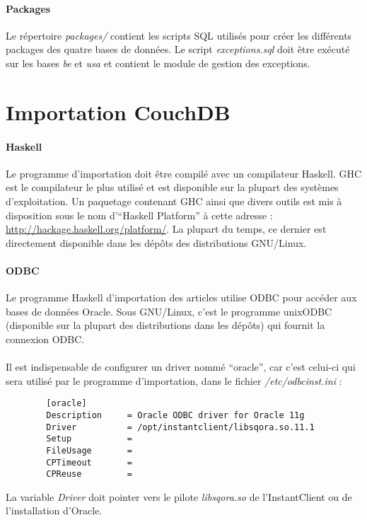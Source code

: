 \documentclass[a4paper,12pt,french]{article}
\begin{document}
    \paragraph{Packages}
    Le répertoire \textit{packages/} contient les scripts SQL utilisés pour
créer les différents packages des quatre bases de données. Le script
\textit{exceptions.sql} doit être exécuté sur les bases \textit{be} et
\textit{usa} et contient le module de gestion des exceptions.

\section{Importation CouchDB}

    \paragraph{Haskell}
    Le programme d'importation doit être compilé avec un compilateur Haskell.
GHC est le compilateur le plus utilisé et est disponible sur la plupart des
systèmes d'exploitation. Un paquetage contenant GHC ainsi que divers outils est
mis à disposition sous le nom d'\enquote{Haskell Platform} à cette adresse :
\url{http://hackage.haskell.org/platform/}. La plupart du temps, ce dernier est
directement disponible dans les dépôts des distributions GNU/Linux.

    \paragraph{ODBC}
    Le programme Haskell d'importation des articles utilise ODBC pour accéder
aux bases de données Oracle. Sous GNU/Linux, c'est le programme unixODBC
(disponible sur la plupart des distributions dans les dépôts) qui fournit la
connexion ODBC.

    \paragraph{}
    Il est indispensable de configurer un driver nommé \enquote{oracle}, car
c'est celui-ci qui sera utilisé par le programme d'importation, dans le fichier
\textit{/etc/odbcinst.ini} :
    \begin{lstlisting}
        [oracle]
        Description     = Oracle ODBC driver for Oracle 11g
        Driver          = /opt/instantclient/libsqora.so.11.1
        Setup           =
        FileUsage       =
        CPTimeout       =
        CPReuse         = 
    \end{lstlisting}
    La variable \textit{Driver} doit pointer vers le pilote \textit{libsqora.so}
de l'InstantClient ou de l'installation d'Oracle.
\end{document}
